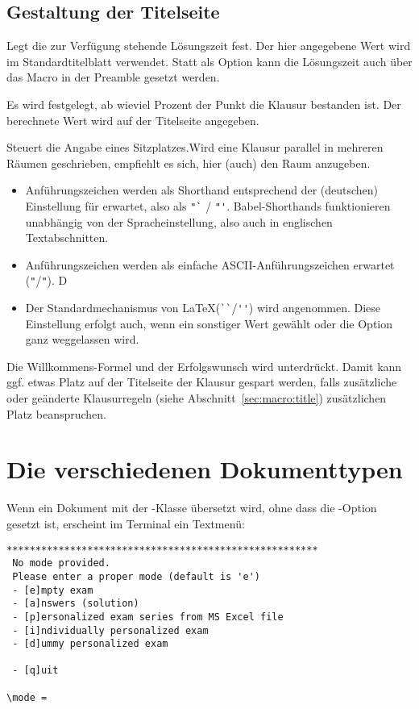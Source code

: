 \documentclass[
load=osgexam,
babel=ngerman
]{skdoc}
\begin{document}
\subsection*{Gestaltung der Titelseite}
Legt die zur Verfügung stehende Lösungszeit fest. Der hier angegebene Wert wird im Standardtitelblatt verwendet.
Statt als Option kann die Lösungszeit auch über das Macro  in der Preamble gesetzt werden.
\medskip

Es wird festgelegt, ab wieviel Prozent der Punkt die Klausur bestanden ist. Der berechnete Wert wird auf der Titelseite
angegeben.
\medskip

 Steuert die Angabe eines Sitzplatzes.Wird eine Klausur parallel in mehreren Räumen
geschrieben, empfiehlt es sich, hier (auch) den Raum anzugeben.
\begin{itemize}[nosep]
  \item [\opt{babelshorthands}] Anführungszeichen werden als Shorthand entsprechend der (deutschen) Einstellung für
     erwartet, also als \verb!"`! / \verb!"'!. Babel-Shorthands funktionieren unabhängig von der
    Spracheinstellung, also auch in englischen Textabschnitten.
  \item [\opt{ascii}] Anführungszeichen werden als einfache ASCII-Anführungszeichen erwartet (\verb!"!/\verb!"!). D
  \item [\opt{latex}]  Der Standardmechanismus von \LaTeX (\verb!``!/\verb!''!) wird angenommen. Diese Einstellung
    erfolgt auch, wenn ein sonstiger Wert gewählt oder die Option ganz weggelassen wird.
\end{itemize}

\medskip

Die Willkommens-Formel und der Erfolgswunsch wird unterdrückt. Damit kann ggf. etwas Platz auf der
Titelseite der Klausur gespart werden, falls zusätzliche oder geänderte Klausurregeln (siehe Abschnitt~\ref{sec:macro:title})
zusätzlichen Platz beanspruchen. 
\medskip

\section{Die verschiedenen Dokumenttypen}
Wenn ein Dokument mit der \thepkg-Klasse übersetzt wird, ohne dass die -Option gesetzt ist, erscheint
im Terminal ein Textmenü:
\begin{verbatim}
******************************************************
 No mode provided.
 Please enter a proper mode (default is 'e') 
 - [e]mpty exam
 - [a]nswers (solution)
 - [p]ersonalized exam series from MS Excel file
 - [i]ndividually personalized exam
 - [d]ummy personalized exam

 - [q]uit 

\mode =
\end{verbatim}
\end{document}
